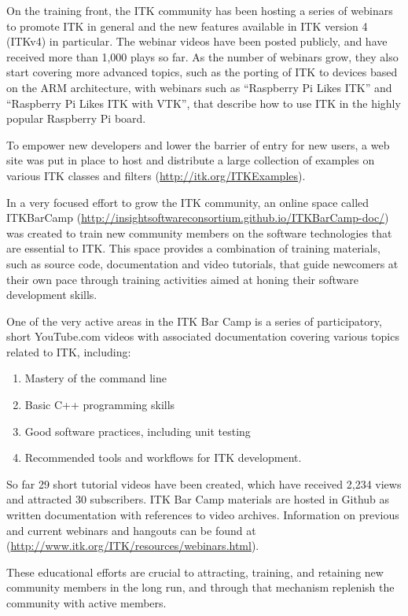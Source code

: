 \documentclass{frontiersENG} %
\begin{document}
On the training front, the ITK community has been hosting a series of webinars
to promote ITK in general and the new features available in ITK version 4
(ITKv4) in particular. The webinar videos have been posted publicly, and have
received more than 1,000 plays so far. As the number of webinars grow, they
also start covering more advanced topics, such as the porting of ITK to
devices based on the ARM architecture, with webinars such as ``Raspberry Pi
Likes ITK'' and ``Raspberry Pi Likes ITK with VTK'', that describe how to use
ITK in the highly popular Raspberry Pi board.

To empower new developers and lower the barrier of entry for new users, a web
site was put in place to host and distribute a large collection of examples on
various ITK classes and filters (\url{http://itk.org/ITKExamples}).

In a very focused effort to grow the ITK community, an online space called
ITKBarCamp (\url{http://insightsoftwareconsortium.github.io/ITKBarCamp-doc/})
was created to train new community members on the software technologies that
are essential to ITK. This space provides a combination of training materials,
such as source code, documentation and video tutorials, that guide newcomers at
their own pace through training activities aimed at honing their software
development skills.

One of the very active areas in the ITK Bar Camp is a series of participatory,
short YouTube.com videos with associated documentation covering various topics
related to ITK, including:
\begin{enumerate}
\item Mastery of the command line
\item Basic C++ programming skills
\item Good software practices, including unit testing
\item Recommended tools and workflows for ITK development.
\end{enumerate}

So far 29 short tutorial videos have been created, which have received 2,234
views and attracted 30 subscribers. ITK Bar Camp materials are hosted in Github
as written documentation with references to video archives. Information on
previous and current webinars and hangouts can be found at
(\url{http://www.itk.org/ITK/resources/webinars.html}).

These educational efforts are crucial to attracting, training, and retaining
new community members in the long run, and through that mechanism replenish the
community with active members.
\end{document}
